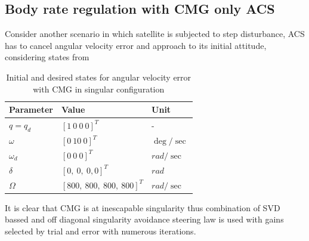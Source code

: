 \subsection{Body rate regulation with CMG only ACS}
Consider another scenario in which satellite is subjected to  step disturbance, ACS has to cancel angular velocity error and approach to its initial attitude, considering states from 


\begin{table}[!h]
        \centering
        
\begin{tabular}{p{}|p{}|p{}}
\toprule
 Parameter & Value & Unit \\
\midrule
 $\displaystyle q=q_{d}$ & $\displaystyle [ 1\ 0\ 0\ 0]^{T}$ & - \\
\hline 
 $\displaystyle \omega $ & $\displaystyle [ 0\ 10\ 0]^{T}$ & $\displaystyle \deg /\sec$ \\
\hline 
 $\displaystyle \omega _{d}$ & $\displaystyle [ 0\ 0\ 0]^{T}$ & $\displaystyle rad/\sec$ \\
\hline 
 $\displaystyle \delta $ & $\displaystyle [ 0,\ 0,\ 0,0]^{T}$ & $\displaystyle rad$ \\
\hline 
 $\displaystyle \Omega $ & $\displaystyle [ 800,\ 800,\ 800,\ 800]^{T}$ & $\displaystyle rad/\sec$ \\
 \bottomrule
\end{tabular}
\caption{Initial and desired states for angular velocity error with CMG in singular configuration}
\label{tbl_cmg_at_sing}
\end{table}
It is clear that CMG is at inescapable singularity thus combination of SVD bassed and off diagonal singularity avoidance steering law is used with gains selected by trial and error with numerous iterations.

